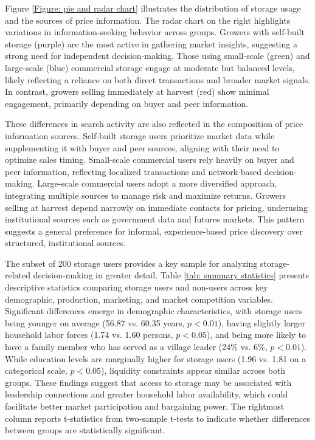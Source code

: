 Figure \ref{Figure: pie and radar chart} illustrates the distribution of storage usage and the sources of price information. The radar chart on the right highlights variations in information-seeking behavior across groups. Growers with self-built storage (purple) are the most active in gathering market insights, suggesting a strong need for independent decision-making. Those using small-scale (green) and large-scale (blue) commercial storage engage at moderate but balanced levels, likely reflecting a reliance on both direct transactions and broader market signals. In contrast, growers selling immediately at harvest (red) show minimal engagement, primarily depending on buyer and peer information.  

These differences in search activity are also reflected in the composition of price information sources. Self-built storage users prioritize market data while supplementing it with buyer and peer sources, aligning with their need to optimize sales timing. Small-scale commercial users rely heavily on buyer and peer information, reflecting localized transactions and network-based decision-making. Large-scale commercial users adopt a more diversified approach, integrating multiple sources to manage risk and maximize returns. Growers selling at harvest depend narrowly on immediate contacts for pricing, underusing institutional sources such as government data and futures markets. This pattern suggests a general preference for informal, experience-based price discovery over structured, institutional sources.



The subset of 200 storage users provides a key sample for analyzing storage-related decision-making in greater detail. Table \ref{tab: summary statistics} presents descriptive statistics comparing storage users and non-users across key demographic, production, marketing, and market competition variables. Significant differences emerge in demographic characteristics, with storage users being younger on average (56.87 vs. 60.35 years, $p < 0.01$), having slightly larger household labor forces (1.74 vs. 1.60 persons, $p < 0.05$), and being more likely to have a family member who has served as a village leader (24\% vs. 6\%, $p < 0.01$). While education levels are marginally higher for storage users (1.96 vs. 1.81 on a categorical scale, $p < 0.05$), liquidity constraints appear similar across both groups. These findings suggest that access to storage may be associated with leadership connections and greater household labor availability, which could facilitate better market participation and bargaining power. The rightmost column reports t-statistics from two-sample t-tests to indicate whether differences between groups are statistically significant.  

